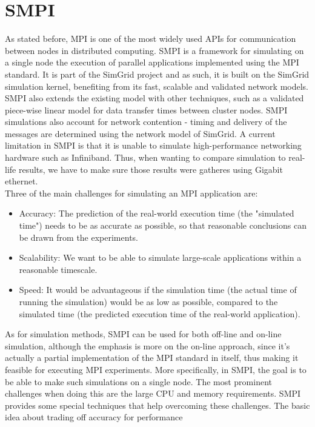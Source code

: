 \section{SMPI}
As stated before, MPI is one of the most widely used APIs for
communication between nodes in distributed computing. SMPI is a
framework for simulating on a single node the execution of parallel
applications implemented using the MPI standard. It is part of the
SimGrid project and as such, it is built on the SimGrid simulation
kernel, benefiting from its fast, scalable and validated network
models. SMPI also extends the existing model with other techniques,
such as a validated piece-wise linear model for data transfer times
between cluster nodes. SMPI simulations also account for network
contention - timing and delivery of the messages are determined using
the network model of SimGrid.\cite{csgscq11} A current limitation in
SMPI is that it is unable to simulate high-performance networking
hardware such as Infiniband. Thus, when wanting to compare simulation
to real-life results, we have to make sure those results were gatheres
using Gigabit ethernet.\\[0.3cm]
Three of the main challenges for simulating an MPI application are:
\begin{itemize}
\item Accuracy: The prediction of the real-world execution time (the
  "simulated time") needs to be as accurate as possible, so that
  reasonable conclusions can be drawn from the experiments.
\item Scalability: We want to be able to simulate large-scale
  applications within a reasonable timescale.
\item Speed: It would be advantageous if the simulation time (the
  actual time of running the simulation) would be as low as possible,
  compared to the simulated time (the predicted execution time of the
  real-world application).
\end{itemize}
As for simulation methods, SMPI can be used for both off-line and
on-line simulation, although the emphasis is more on the on-line
approach, since it's actually a partial implementation of the MPI
standard in itself, thus making it feasible for executing MPI
experiments. More specifically, in SMPI, the goal is to be able to
make such simulations on a single node. The most prominent challenges
when doing this are the large CPU and memory requirements. SMPI
provides some special techniques that help overcoming these
challenges. The basic idea about trading off accuracy for performance

